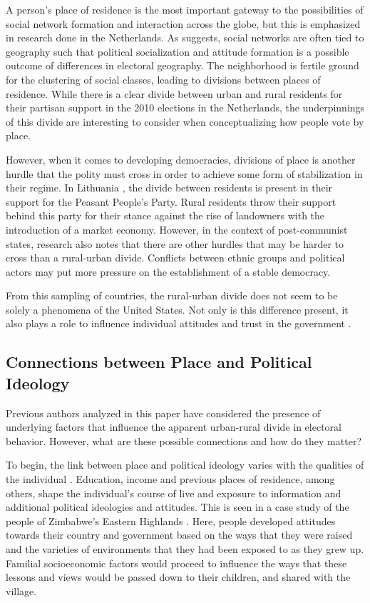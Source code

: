 \documentclass[12pt, titlepage]{article}
\begin{document}
A person's place of residence is the most important gateway to the possibilities of social network formation and interaction across the globe, but this is emphasized in research done in the Netherlands. As \cite{van_gent_right-wing_2014} suggests, social networks are often tied to geography such that political socialization and attitude formation is a possible outcome of differences in electoral geography. The neighborhood is fertile ground for the clustering of social classes, leading to divisions between places of residence. While there is a clear divide between urban and rural residents for their partisan support in the 2010 elections in the Netherlands, the underpinnings of this divide are interesting to consider when conceptualizing how people vote by place.

However, when it comes to developing democracies, divisions of place is another hurdle that the polity must cross in order to achieve some form of stabilization in their regime. In Lithuania \citep{jurkynas_emerging_2004}, the divide between residents is present in their support for the Peasant People's Party. Rural residents throw their support behind this party for their stance against the rise of landowners with the introduction of a market economy. However, in the context of post-communist states, research also notes that there are other hurdles that may be harder to cross than a rural-urban divide. Conflicts between ethnic groups and political actors may put more pressure on the establishment of a stable democracy. 

From this sampling of countries, the rural-urban divide does not seem to be solely a phenomena of the United States. Not only is this difference present, it also plays a role to influence individual attitudes and trust in the government \citep{ahn_political_1986}. 

\subsection{Connections between Place and Political Ideology}

Previous authors analyzed in this paper have considered the presence of underlying factors that influence the apparent urban-rural divide in electoral behavior. However, what are these possible connections and how do they matter? 

To begin, the link between place and political ideology varies with the qualities of the individual \citep{orbell_impact_1970}. Education, income and previous places of residence, among others, shape the individual's course of live and exposure to information and additional political ideologies and attitudes. This is seen in a case study of the people of Zimbabwe's Eastern Highlands \citep{moore_subaltern_1998}. Here, people developed attitudes towards their country and government based on the ways that they were raised and the varieties of environments that they had been exposed to as they grew up. Familial socioeconomic factors would proceed to influence the ways that these lessons and views would be passed down to their children, and shared with the village. 
\end{document}
